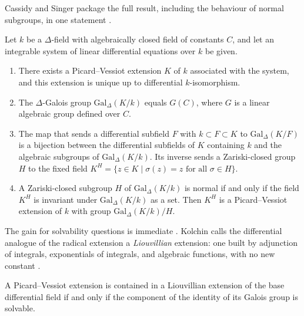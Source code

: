 Cassidy and Singer package the full result, including the behaviour of
normal subgroups, in one statement
\cite[Theorem~2.1, pp.~5--6]{CassidySinger2007}.

\begin{theorem}\label{thm:diffalg:pv-fundamental}
Let $k$ be a $\Delta$-field with algebraically closed field of constants
$C$, and let an integrable system of linear differential equations over
$k$ be given.

\begin{enumerate}
\item There exists a Picard--Vessiot extension $K$ of $k$ associated with
  the system, and this extension is unique up to differential
  $k$-isomorphism.
\item The $\Delta$-Galois group $\mathrm{Gal}_\Delta(K/k)$ equals
  $G(C)$, where $G$ is a linear algebraic group defined over $C$.
\item The map that sends a differential subfield $F$ with
  $k\subset F\subset K$ to $\mathrm{Gal}_\Delta(K/F)$ is a bijection
  between the differential subfields of $K$ containing $k$ and the
  algebraic subgroups of $\mathrm{Gal}_\Delta(K/k)$. Its inverse sends a
  Zariski-closed group $H$ to the fixed field
  $K^H = \{z\in K \mid \sigma(z) = z \text{ for all }\sigma\in H\}$.
\item A Zariski-closed subgroup $H$ of $\mathrm{Gal}_\Delta(K/k)$ is
  normal if and only if the field $K^H$ is invariant under
  $\mathrm{Gal}_\Delta(K/k)$ as a set. Then $K^H$ is a Picard--Vessiot
  extension of $k$ with group $\mathrm{Gal}_\Delta(K/k)/H$.
\end{enumerate}
\end{theorem}

The gain for solvability questions is immediate
\cite[pp.~5--6]{Kolchin1948PicardVessiot}. Kolchin calls the
differential analogue of the radical extension a \emph{Liouvillian}
extension: one built by adjunction of integrals, exponentials of
integrals, and algebraic functions, with no new constant
\cite[pp.~5--6]{Kolchin1948PicardVessiot}.

\begin{theorem}\label{thm:diffalg:pv-liouvillian}
A Picard--Vessiot extension is contained in a Liouvillian extension of
the base differential field if and only if the component of the identity
of its Galois group is solvable.
\end{theorem}

